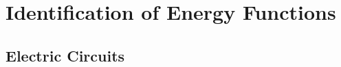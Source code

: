 \chapter[Identification of Energy Functions]{Identification of Energy Functions}


\newcommand{\half}{
	\dfrac{1}{2}
}

\renewcommand{\row}[4]{
	\small #1 & \small #2 & \small #3 & \small #4\\
}
\renewcommand{\separation}{
			\multicolumn{4}{c}{}\\[-1em]
	        \hline
	        \multicolumn{4}{c}{}\\[-1em]
}

% 		        
% 		        

\section{Electric Circuits}

